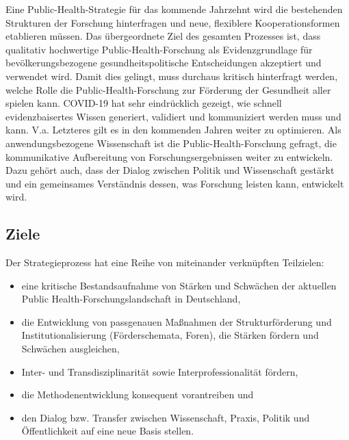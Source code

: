 \documentclass{article}
\begin{document}
Eine Public-Health-Strategie für das kommende Jahrzehnt wird die bestehenden Strukturen der Forschung hinterfragen und neue, flexiblere Kooperationsformen etablieren müssen. Das übergeordnete Ziel des gesamten Prozesses ist, dass qualitativ hochwertige Public-Health-Forschung als Evidenzgrundlage für bevölkerungsbezogene gesundheitspolitische Entscheidungen akzeptiert und verwendet wird. Damit dies gelingt, muss durchaus kritisch hinterfragt werden, welche Rolle die Public-Health-Forschung zur Förderung der Gesundheit aller spielen kann. COVID-19 hat sehr eindrücklich gezeigt, wie schnell evidenzbaisertes Wissen generiert, validiert und kommuniziert werden muss und kann. V.a. Letzteres gilt es in den kommenden Jahren weiter zu optimieren. Als anwendungsbezogene Wissenschaft ist die Public-Health-Forschung gefragt, die kommunikative Aufbereitung von Forschungsergebnissen weiter zu entwickeln. Dazu gehört auch, dass der Dialog zwischen Politik und Wissenschaft gestärkt und ein gemeinsames Verständnis dessen, was Forschung leisten kann, entwickelt wird.


\subsection{Ziele}\label{H3346375}



Der Strategieprozess hat eine Reihe von miteinander verknüpften Teilzielen: 

\begin{itemize}
\item eine kritische Bestandsaufnahme von Stärken und Schwächen der aktuellen Public Health-Forschungslandschaft in Deutschland,


\item die Entwicklung von passgenauen Maßnahmen der Strukturförderung und Institutionalisierung (Förderschemata, Foren), die Stärken fördern und Schwächen ausgleichen,


\item Inter- und Transdisziplinarität sowie Interprofessionalität fördern,


\item die Methodenentwicklung konsequent vorantreiben und 


\item den Dialog bzw. Transfer zwischen Wissenschaft, Praxis, Politik und Öffentlichkeit auf eine neue Basis stellen. 


\end{itemize}
\end{document}
